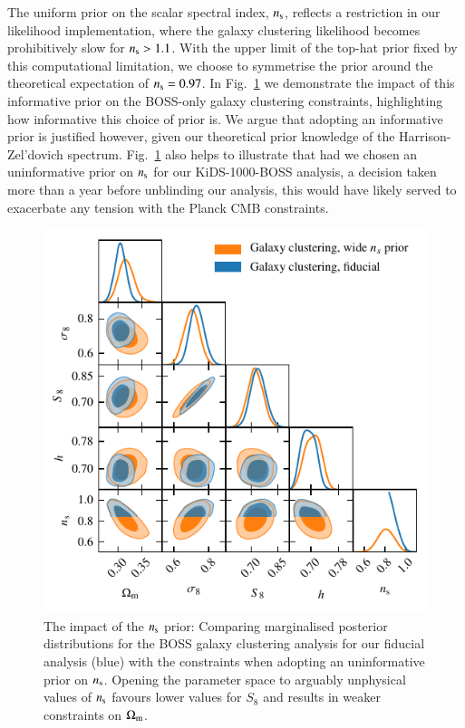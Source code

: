 \begin{appendix}
The uniform prior on the scalar spectral index, $n_{\rm s}$, reflects a restriction in our likelihood implementation, where the \citet{sanchez/etal:2017} galaxy clustering likelihood becomes prohibitively slow for $n_{\rm s}>1.1$.  With the upper limit of the top-hat prior fixed by this computational limitation, we choose to symmetrise the prior around the theoretical expectation of $n_{\rm s}=0.97$.     In Fig.~\ref{fig:ns-prior} we demonstrate the impact of this informative prior on the BOSS-only galaxy clustering constraints, highlighting how informative this choice of prior is.   We argue that adopting an informative prior is justified however, given our theoretical prior knowledge of the Harrison-Zel'dovich spectrum.   Fig.~\ref{fig:ns-prior} also helps to illustrate that had we chosen an uninformative prior on $n_{\rm s}$ for our KiDS-1000-BOSS analysis, a decision taken more than a year before unblinding our analysis, this would have likely served to exacerbate any tension with the Planck CMB constraints. 

\begin{figure}
	\begin{center}
		\includegraphics[width=\columnwidth]{Parameter_Plots/systematics/GC_ns_prior}
		\caption{The impact of the $n_{\rm s}$ prior: Comparing marginalised posterior distributions for the BOSS galaxy clustering analysis for our fiducial analysis (blue) with the constraints when adopting an uninformative prior on $n_{\rm s}$.   Opening the parameter space to arguably unphysical values of $n_{\rm s}$ favours lower values for $S_8$ and results in weaker constraints on $\Omega_{\rm m}$.}
		\label{fig:ns-prior}
	\end{center}
\end{figure}


\end{appendix}
